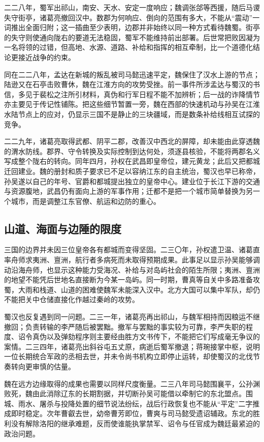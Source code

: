 二二八年，蜀军出祁山，南安、天水、安定一度响应；魏调张郃等西援，随后马谡失守街亭，诸葛亮撤回汉中。数郡为何响应、倒向的范围有多大，不能从“震动”一词推出全面归附；这一插曲至少表明，边郡并非始终以同一种方式看待魏蜀。街亭的失守则使通向陇右的要道无法稳固，蜀军不能维持前出部署。后世常把败因凝为一名将领的过错，但高地、水源、道路、补给和指挥的相互牵制，比一个道德化结论更接近战争的约束。

同在二二八年，孟达在新城的叛乱被司马懿迅速平定，魏保住了汉水上游的节点；陆逊又在石亭击败曹休，魏在江淮方向的攻势受挫。前一事件所涉孟达与蜀汉的书信，多见于裴松之注所引材料，真伪和行军日程不能不加辨析；后一战的诈降情节亦主要见于传记性铺陈。把这些细节暂置一旁，魏在西部的快速机动与孙吴在江淮水陆节点上的应对，仍显示三国不是静止的三块疆域，而是数条补给线相互试探的竞争。

二二九年，诸葛亮取得武都、阴平二郡，改善汉中西北的屏障，却未能由此穿透魏的渭水防线。郡界、守令转换及实际控制到达何处，须逐县核验，不能将两郡名义写成整个陇右的转向。同年四月，孙权在武昌即皇帝位，建元黄龙；此后又把都城迁回建业。魏的册封和质子要求已不足以容纳江东的自主统治，蜀汉也早已称帝，孙吴遂以自己的年号、官爵和都城提出独立的皇帝中心。建业位于长江下游的交通与资源腹地，武昌仍有面向上游的军事作用；迁都不是把一个城市简单替换为另一个城市，而是调整江东官僚、航运和边防的重心。

\subsection{山道、海面与边陲的限度}

三国的边界并未因三位皇帝各有都城而变得坚固。二三〇年，孙权遣卫温、诸葛直率舟师求夷洲、亶洲，航行者多病死而未取得预期成果。此事足以显示孙吴能够调动沿海舟师，也显示这种能力受海况、补给与对岛屿社会的陌生所限；夷洲、亶洲的地望不能凭后世地名直接断为今某一岛屿。同一时期，曹真等自关中多路准备攻蜀，大雨和栈道、山道的困难使魏军未能深入汉中。北方大国可以集中军队，却仍不能把关中仓储直接化作越过秦岭的攻势。

蜀汉也反复遇到同一问题。二三一年，诸葛亮再出祁山，与魏军相持而因粮运不继撤回；负责转输的李严随后被罢黜。撤军与罢黜的事实较为可靠，李严失职的程度、诏令真伪以及弹劾程序则主要经由胜方文书传下，不能把它们写成毫无争议的案情。二三四年，诸葛亮出斜谷屯五丈原，病逝后蜀军撤退；蒋琬接掌中枢，说明一位长期统合军政的丞相去世，并未令尚书机构立即停止运转，却使蜀汉的北伐节奏转向更审慎的估量。

魏在远方边缘取得的成果也需要以同样尺度衡量。二三八年司马懿围襄平，公孙渊败死，魏由此消除辽东的长期割据，并切断孙吴可能借以牵制它的东北盟点。围城、雨水、屠杀与投降处置的细节说法纷纭，战后行政恢复也不能从“平定”二字推成即时稳定。次年曹叡去世，幼帝曹芳即位，曹爽与司马懿受遗诏辅政。东北的胜利没有解除洛阳的继承难题，反而使谁能执掌禁军、诏令与任官成为魏廷最紧迫的政治问题。

